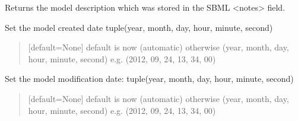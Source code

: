 \documentclass[letterpaper,12pt,english]{sphinxmanual}
\begin{document}
\begin{fulllineitems}
\begin{fulllineitems}
\begin{quote}
\begin{description}
\end{description}\end{quote}

\end{fulllineitems}


\begin{fulllineitems}
\label{\detokenize{api/core:cbmpy.CBModel.Model.getDescription}}
\pysigstartsignatures
\pysiglinewithargsret
{}
{}
{}
\pysigstopsignatures
\sphinxAtStartPar
Returns the model description which was stored in the SBML \textless{}notes\textgreater{} field.

\end{fulllineitems}


\begin{fulllineitems}
\label{\detokenize{api/core:cbmpy.CBModel.Model.setCreatedDate}}
\pysigstartsignatures
\pysiglinewithargsret
{}
{}
{}
\pysigstopsignatures
\sphinxAtStartPar
Set the model created date tuple(year, month, day, hour, minute, second)
\begin{quote}\begin{description}
\sphinxAtStartPar
{} \textendash{} {[}default=None{]} default is now (automatic) otherwise (year, month, day, hour, minute, second) e.g. (2012, 09, 24, 13, 34, 00)

\end{description}\end{quote}

\end{fulllineitems}


\begin{fulllineitems}
\label{\detokenize{api/core:cbmpy.CBModel.Model.setModifiedDate}}
\pysigstartsignatures
\pysiglinewithargsret
{}
{}
{}
\pysigstopsignatures
\sphinxAtStartPar
Set the model modification date: tuple(year, month, day, hour, minute, second)
\begin{quote}\begin{description}
\sphinxAtStartPar
{} \textendash{} {[}default=None{]} default is now (automatic) otherwise (year, month, day, hour, minute, second) e.g. (2012, 09, 24, 13, 34, 00)


\end{description}
\end{quote}
\end{fulllineitems}
\end{fulllineitems}
\end{document}
